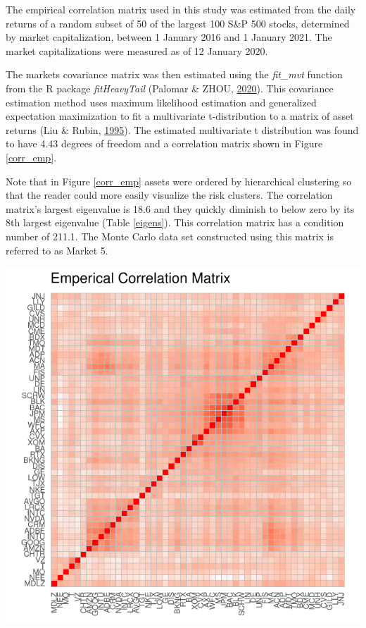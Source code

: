 \documentclass[11pt,preprint, authoryear]{elsarticle}
\let\origfigure\figure
\let\endorigfigure\endfigure
\renewenvironment{figure}[1][2] {
    \expandafter\origfigure\expandafter[H]
} {
    \endorigfigure
}
\numberwithin{equation}{section}
\numberwithin{figure}{section}
\numberwithin{table}{section}
\begin{document}
The empirical correlation matrix used in this study was estimated from
the daily returns of a random subset of 50 of the largest 100 S\&P 500
stocks, determined by market capitalization, between 1 January 2016 and
1 January 2021. The market capitalizations were measured as of 12
January 2020.

The markets covariance matrix was then estimated using the
\emph{fit\_mvt} function from the R package \emph{fitHeavyTail} (Palomar
\& ZHOU, \protect\hyperlink{ref-fitHeavyTail}{2020}). This covariance
estimation method uses maximum likelihood estimation and generalized
expectation maximization to fit a multivariate t-distribution to a
matrix of asset returns (Liu \& Rubin,
\protect\hyperlink{ref-liu1995}{1995}). The estimated multivariate t
distribution was found to have 4.43 degrees of freedom and a correlation
matrix shown in Figure \ref{corr_emp}.

Note that in Figure \ref{corr_emp} assets were ordered by hierarchical
clustering so that the reader could more easily visualize the risk
clusters. The correlation matrix's largest eigenvalue is 18.6 and they
quickly diminish to below zero by its 8th largest eigenvalue (Table
\ref{eigens}). This correlation matrix has a condition number of 211.1.
The Monte Carlo data set constructed using this matrix is referred to as
Market 5.

\begin{figure}
\centering
\includegraphics{Thesis_files/figure-latex/unnamed-chunk-1-1.pdf}
\caption{\label{corr_emp} Emperical Correlation Matrix}
\end{figure}
\end{document}
